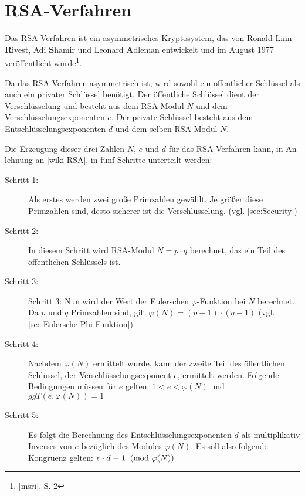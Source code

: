 \section{RSA-Verfahren}\label{sec:RSA-Verfahren}
Das RSA-Verfahren ist ein asymmetrisches Kryptosystem, das von 
Ronald Linn \textbf{R}ivest, Adi \textbf{S}hamir und Leonard 
\textbf{A}dleman entwickelt und im August 1977 veröffentlicht wurde\footnote{[msri], S. 2}.

Da das RSA-Verfahren asymmetrisch ist, wird sowohl ein öffentlicher 
Schlüssel als auch ein privater Schlüssel benötigt. Der öffentliche 
Schlüssel dient der Verschlüsselung und besteht aus dem RSA-Modul $N$ 
und dem Verschlüsselungsexponenten $e$. Der private Schlüssel 
besteht aus dem Entschlüsselungsexponenten $d$ und dem selben RSA-Modul $N$.

Die Erzeugung dieser drei Zahlen $N$, $e$ und $d$ für das RSA-Verfahren 
kann, in An-lehnung an [wiki-RSA], in fünf Schritte unterteilt werden:

\begin{description}
    \item[Schritt 1:] Als erstes werden zwei große Primzahlen  gewählt. 
                      Je größer diese Primzahlen sind, desto sicherer 
                      ist die Verschlüsselung.
                     (vgl. \cref{sec:Security})
    \item[Schritt 2:] In diesem Schritt wird RSA-Modul $N = p \cdot q$ 
                      berechnet, das ein Teil des öffentlichen 
                      Schlüssels ist.
    \item[Schritt 3:] Schritt 3: Nun wird der Wert der Eulerschen 
                      $\varphi$-Funktion bei $N$ berechnet. Da $p$ 
                      und $q$ Primzahlen sind, gilt $\varphi(N) = (p-1) \cdot (q-1)$ (vgl. \cref{sec:Eulersche-Phi-Funktion})
    \item[Schritt 4:] Nachdem $\varphi(N)$ ermittelt wurde, kann der 
                      zweite Teil des öffentlichen Schlüssel, der 
                      Verschlüsselungsexponent $e$, ermittelt werden. 
                      Folgende Bedingungen müssen für $e$ gelten:
                      $1 < e < \varphi(N) $  und $ggT(e, \varphi(N)) = 1$
    \item[Schritt 5:] Es folgt die Berechnung des Entschlüsselungsexponenten 
                      $d$ als multiplikativ Inverses von $e$ 
                      bezüglich des Modules $\varphi(N)$. Es soll 
                      also folgende Kongruenz gelten:
                      $e \cdot d \equiv 1 \imod{\varphi(N)}$

\end{description}


